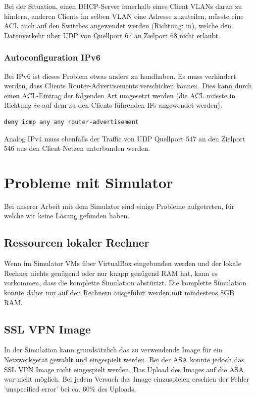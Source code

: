 \documentclass[11pt,a4paper,parskip=half]{scrartcl}
\begin{document}
Bei der Situation, einen DHCP-Server innerhalb eines Client VLANs daran zu hindern, anderen Clients im selben VLAN eine Adresse zuzuteilen, müsste eine ACL auch auf den Switches angewendet werden (Richtung: in), welche den Datenverkehr über UDP von Quellport 67 an Zielport 68 nicht erlaubt.

\subsubsection{Autoconfiguration IPv6}
Bei IPv6 ist dieses Problem etwas anders zu handhaben. Es muss verhindert werden, dass Clients Router-Advertisements verschicken können. Dies kann durch einen ACL-Eintrag der folgenden Art umgesetzt werden (die ACL müsste in Richtung \emph{in} auf dem zu den Clients führenden IFs angewendet werden):

\begin{lstlisting}
deny icmp any any router-advertisement
\end{lstlisting}

Analog IPv4 muss ebenfalls der Traffic von UDP Quellport 547 an den Zielport 546 aus den Client-Netzen unterbunden werden.

\newpage
\section{Probleme mit Simulator}
Bei unserer Arbeit mit dem Simulator sind einige Probleme aufgetreten, für welche wir keine Lösung gefunden haben.

\subsection{Ressourcen lokaler Rechner}
Wenn im Simulator VMs über VirtualBox eingebunden werden und der lokale Rechner nichts genügend oder nur knapp genügend RAM hat, kann es vorkommen, dass  die komplette Simulation abstürtzt. Die komplette Simulation konnte daher nur auf den Rechnern ausgeführt werden mit mindestens 8GB RAM.
\subsection{SSL VPN Image}
In der Simulation kann grundsätzlich das zu verwendende Image für ein Netzwerkgerät gewählt und eingespielt werden. Bei der ASA konnte jedoch das SSL VPN Image nicht eingespielt werden. Das Upload des Images auf die ASA war nicht möglich. Bei jedem Versuch das Image einzuspielen erschien der Fehler 'unspecified error' bei ca. 60\% des Uploads.
\end{document}
